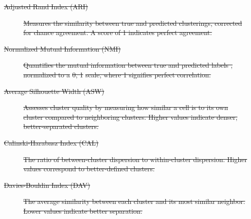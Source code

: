 \documentclass[referee, pdflatex, sn-vancouver-num]{sn-jnl}
\providecommand{\DIFdeltex}[1]{{\protect\color{red}\sout{#1}}}                      %
\providecommand{\DIFdel}[1]{\texorpdfstring{\DIFdeltex{#1}}{}} %
\begin{document}
\begin{description}%
\item[\DIFdel{Adjusted Rand Index (ARI)}]%
\DIFdel{Measures the similarity between true and predicted clusterings, corrected for chance agreement. A score of 1 indicates perfect agreement.
    }%
\item[\DIFdel{Normalized Mutual Information (NMI)}]%
\DIFdel{Quantifies the mutual information between true and predicted labels , normalized to a }%
\DIFdel{0, 1}%
\DIFdel{scale, where 1 signifies perfect correlation.
    }%
\item[\DIFdel{Average Silhouette Width (ASW)}]%
\DIFdel{Assesses cluster quality by measuring how similar a cell is to its own cluster compared to neighboring clusters. Higher values indicate denser, better-separated clusters.
    }%
\item[\DIFdel{Calinski-Harabasz Index (CAL)}]%
\DIFdel{The ratio of between-cluster dispersion to within-cluster dispersion. Higher values correspond to better-defined clusters. }%
\item[\DIFdel{Davies-Bouldin Index (DAV)}]%
\DIFdel{The average similarity between each cluster and its most similar neighbor. Lower values indicate better separation.
}
\end{description}%

\end{document}
